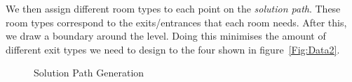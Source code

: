 \documentclass[11pt]{article}
\begin{document}
We then assign different room types to each point on the \textit{solution path}. These room types correspond to the exits/entrances that each room needs. After this, we draw a boundary around the level. Doing this minimises the amount of different exit types we need to design to the four shown in figure~\ref{Fig:Data2}.

\begin{figure}[!htb]\centering
   \begin{minipage}{0.49\textwidth}
     \caption{Solution Path Generation}\label{Fig:Data1}
   \end{minipage}
   \begin {minipage}{0.49\textwidth}

\end{minipage}
\end{figure}
\end{document}
